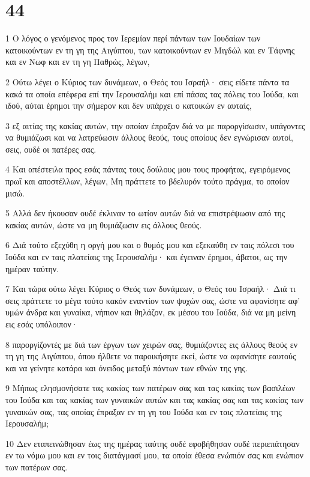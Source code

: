 \chapter{44}

\par 1 Ο λόγος ο γενόμενος προς τον Ιερεμίαν περί πάντων των Ιουδαίων των κατοικούντων εν τη γη της Αιγύπτου, των κατοικούντων εν Μιγδώλ και εν Τάφνης και εν Νωφ και εν τη γη Παθρώς, λέγων,
\par 2 Ούτω λέγει ο Κύριος των δυνάμεων, ο Θεός του Ισραήλ· σεις είδετε πάντα τα κακά τα οποία επέφερα επί την Ιερουσαλήμ και επί πάσας τας πόλεις του Ιούδα, και ιδού, αύται έρημοι την σήμερον και δεν υπάρχει ο κατοικών εν αυταίς,
\par 3 εξ αιτίας της κακίας αυτών, την οποίαν έπραξαν διά να με παροργίσωσιν, υπάγοντες να θυμιάζωσι και να λατρεύωσιν άλλους θεούς, τους οποίους δεν εγνώρισαν αυτοί, σεις, ουδέ οι πατέρες σας.
\par 4 Και απέστειλα προς εσάς πάντας τους δούλους μου τους προφήτας, εγειρόμενος πρωΐ και αποστέλλων, λέγων, Μη πράττετε το βδελυρόν τούτο πράγμα, το οποίον μισώ.
\par 5 Αλλά δεν ήκουσαν ουδέ έκλιναν το ωτίον αυτών διά να επιστρέψωσιν από της κακίας αυτών, ώστε να μη θυμιάζωσιν εις άλλους θεούς.
\par 6 Διά τούτο εξεχύθη η οργή μου και ο θυμός μου και εξεκαύθη εν ταις πόλεσι του Ιούδα και εν ταις πλατείαις της Ιερουσαλήμ· και έγειναν έρημοι, άβατοι, ως την ημέραν ταύτην.
\par 7 Και τώρα ούτω λέγει Κύριος ο Θεός των δυνάμεων, ο Θεός του Ισραήλ· Διά τι σεις πράττετε το μέγα τούτο κακόν εναντίον των ψυχών σας, ώστε να αφανίσητε αφ' υμών άνδρα και γυναίκα, νήπιον και θηλάζον, εκ μέσου του Ιούδα, διά να μη μείνη εις εσάς υπόλοιπον·
\par 8 παροργίζοντές με διά των έργων των χειρών σας, θυμιάζοντες εις άλλους θεούς εν τη γη της Αιγύπτου, όπου ήλθετε να παροικήσητε εκεί, ώστε να αφανίσητε εαυτούς και να γείνητε κατάρα και όνειδος μεταξύ πάντων των εθνών της γης.
\par 9 Μήπως ελησμονήσατε τας κακίας των πατέρων σας και τας κακίας των βασιλέων του Ιούδα και τας κακίας των γυναικών αυτών και τας κακίας σας και τας κακίας των γυναικών σας, τας οποίας έπραξαν εν τη γη του Ιούδα και εν ταις πλατείαις της Ιερουσαλήμ;
\par 10 Δεν εταπεινώθησαν έως της ημέρας ταύτης ουδέ εφοβήθησαν ουδέ περιεπάτησαν εν τω νόμω μου και εν τοις διατάγμασί μου, τα οποία έθεσα ενώπιόν σας και ενώπιον των πατέρων σας.

